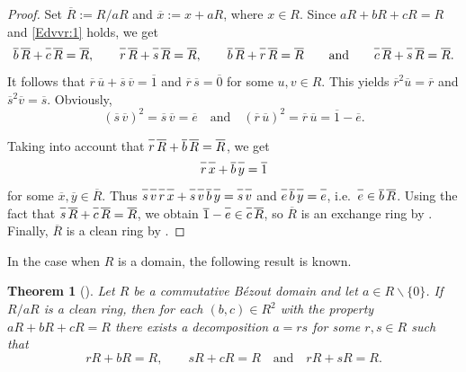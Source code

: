 \documentclass[12pt,a4paper, reqno]{amsart}
\newtheorem{theorem}{Theorem}
\begin{document}
\begin{proof}
Set $\overline{R}:=R/aR$ and $\overline{x}:=x+aR$, where $x\in R$. Since  $aR+bR+cR=R$ and \eqref{Edvvr:1} holds, we get
\[
\overline{b}\,\overline{R\vphantom{b}}+\overline{c\vphantom{b}}\,\overline{R\vphantom{b}}=\overline{R\vphantom{b}},
\qquad
\overline{r\vphantom{b}}\,\overline{R\vphantom{b}}+\overline{s\vphantom{b}}\,\overline{R\vphantom{b}}=\overline{R\vphantom{b}},
\qquad
\overline{b}\,\overline{R\vphantom{b}}+\overline{r\vphantom{b}}\,\overline{R\vphantom{b}}=\overline{R\vphantom{b}}
\qquad
\text{and}
\qquad
\overline{c\vphantom{b}}\,\overline{R\vphantom{b}}+\overline{s\vphantom{b}}\,\overline{R\vphantom{b}}=\overline{R\vphantom{b}}.
\]
It follows that  $\overline{r}\,\overline{u}+\overline{s}\,\overline{v}=\overline{1}$ and $\overline{r}\,\overline{s}=\overline{0}$ for some $u,v\in R$. This yields  $\overline{r}^2\overline{u}=\overline{r}$ and  $\overline{s}^2\overline{v}=\overline{s}$. Obviously,
\[
(\overline{s}\,\overline{v})^2=\overline{s}\,\overline{v}=\overline{e}\quad\text{and} \quad  (\overline{r}\,\overline{u})^2=\overline{r}\,\overline{u}=\overline{1}-\overline{e}.
\]


\smallskip

\noindent
Taking into account that  $\overline{r\vphantom{b}}\,\overline{R\vphantom{b}}+\overline{b}\,\overline{R\vphantom{b}}=\overline{R\vphantom{b}}$,
we get
\[
\overline{r\vphantom{b}}\,\overline{x\vphantom{b}}+\overline{b}\,\overline{y\vphantom{b}}=\overline{1\vphantom{b}}
\]
for some $\overline{x},\overline{y}\in \overline{R}$.
Thus
$\overline{s\vphantom{b}}\,\overline{v\vphantom{b}}\,\overline{r\vphantom{b}}\,\overline{x\vphantom{b}}
+\overline{s\vphantom{b}}\,\overline{v\vphantom{b}}\,\overline{b}\,\overline{y\vphantom{b}}
=\overline{s\vphantom{b}}\,\overline{v\vphantom{b}}$ and
$\overline{e\vphantom{b}}\,\overline{b}\,\overline{y\vphantom{b}}=\overline{e\vphantom{b}}$,
i.e.~$\overline{e\vphantom{b}}\in \overline{b}\,\overline{R\vphantom{b}}$.
Using the fact that  $\overline{s\vphantom{R}}\,\overline{R}+\overline{c\vphantom{R}}\,\overline{R}=\overline{R}$,
we obtain   $\overline{1}-\overline{e\vphantom{R}}\in \overline{c\vphantom{R}}\,\overline{R}$, so  $\overline{R}$ is an exchange ring  by \cite[Proposition 1.1 and Theorem 2.1]{7-kaplansky}.  Finally,  $\overline{R}$ is a clean ring by \cite[p.\,244]{6-mcGovern}.
\end{proof}

In the case when $R$ is a domain,  the following result  is known.

\begin{theorem}[{\!\!\cite[Theorem 31]{9-zabavsky}}]\label{T:6}
Let $R$ be a commutative B\'ezout domain and let $a\in R\backslash\{0\}$. If $R/aR$ is a clean ring,  then for  each $(b,c)\in R^2$ with the property $aR+bR+cR=R$ there exists  a decomposition $a=rs$  for some $r,s\in R$ such that
\[
rR+bR=R,\qquad   sR+cR=R\quad \text{and}\quad  rR+sR=R.
\]
\end{theorem}
\end{document}
